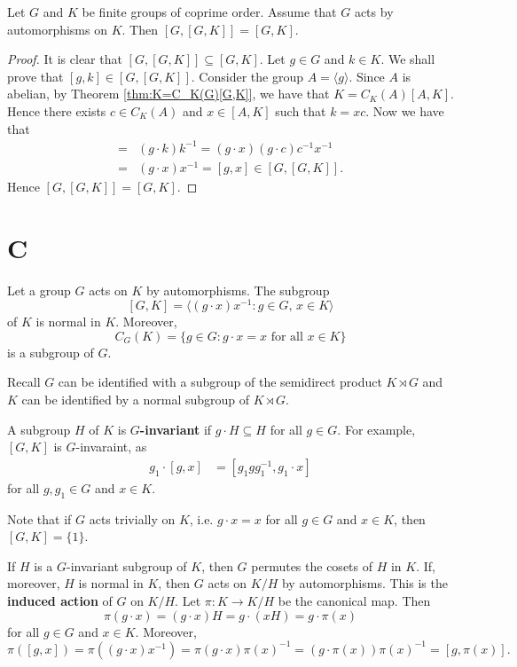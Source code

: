 \begin{corollary}\label{cor:coprimeaction}
Let $G$ and $K$ be finite groups of coprime order. Assume that $G$ acts by automorphisms on $K$. Then $[G,[G,K]]=[G,K]$.
\end{corollary}

\begin{proof}
    It is clear that $[G,[G,K]]\subseteq [G,K]$. Let $g\in G$ and $k\in K$. We shall prove that $[g,k]\in [G,[G,K]]$. Consider the group $A=\langle g\rangle$. Since $A$ is abelian, by Theorem \ref{thm:K=C_K(G)[G,K]}, we have that $K=C_K(A)[A,K]$. Hence there exists $c\in C_K(A)$ and $x\in [A,K]$ such that $k=xc$. Now we have that
    \begin{align*}
        [g,k]=&(g\cdot k)k^{-1}=(g\cdot x)(g\cdot c)c^{-1}x^{-1}\\
        =&(g\cdot x)x^{-1}=[g,x]\in [G,[G,K]].
    \end{align*}
    Hence $[G,[G,K]]=[G,K]$.
\end{proof}

\section*{C}



Let a group $G$ acts on $K$ by automorphisms. The subgroup
\[
[G,K]=\langle (g\cdot x)x^{-1}:g\in G,\,x\in K\rangle
\]
of $K$ is normal in $K$. Moreover, 
\[
C_G(K)=\{g\in G:g\cdot x=x\text{ for all $x\in K$}\}
\]
is a subgroup of $G$. 

Recall $G$ can be identified with a subgroup
of the semidirect product $K\rtimes G$ and $K$ can be identified by a normal 
subgroup of $K\rtimes G$. 

A subgroup $H$ of $K$ is \textbf{$G$-invariant} if $g\cdot H\subseteq H$ for all $g\in G$. 
For example, $[G,K]$ is $G$-invaraint, as
\begin{align*}
g_1\cdot [g,x]&=[g_1gg_1^{-1}, g_1\cdot x]
\end{align*}
for all $g,g_1\in G$ and $x\in K$.

Note that if $G$ acts trivially on $K$, i.e. $g\cdot x=x$ for all $g\in G$ and $x\in K$, then 
$[G,K]=\{1\}$. 

If $H$ is a $G$-invariant subgroup of $K$, then $G$ permutes the cosets of $H$ in $K$. If, moreover, $H$ is normal in $K$, then
$G$ acts on $K/H$ by automorphisms. This is the \textbf{induced action} of $G$ on $K/H$. Let $\pi\colon K\to K/H$ be the canonical
map. Then 
\[
\pi(g\cdot x)=(g\cdot x)H=g\cdot (xH)=g\cdot\pi(x)
\]
for all $g\in G$ and $x\in K$. Moreover, 
\[
\pi([g,x])=\pi( (g\cdot x)x^{-1})=\pi(g\cdot x)\pi(x)^{-1}=(g\cdot\pi(x))\pi(x)^{-1}=[g,\pi(x)].
\]

